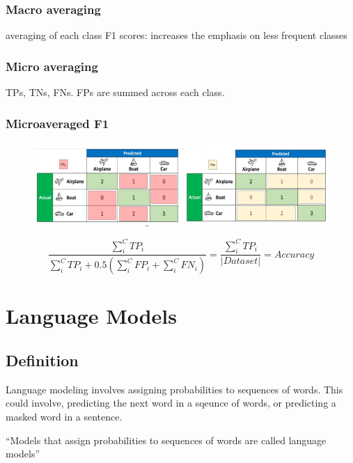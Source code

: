 \documentclass[11pt]{article}
\begin{document}
\subsubsection{Macro averaging}

averaging of each class F1 scores: increases the emphasis on less frequent classes

\subsubsection{Micro averaging}

TPs, TNs,  FNs. FPs are summed across each class.

\subsubsection{Microaveraged F1}

\begin{figure}[H]
    \centering
    \includegraphics[trim={0 .5cm 0 0}, clip, width=.9\linewidth]{figures/f1.png}    
\end{figure}

\begin{equation*}
    \frac{\sum^C_i TP_i}{\sum^C_i TP_i + 0.5 (\sum^C_i FP_i + \sum^C_i FN_i)} = \frac{\sum^C_i TP_i}{|Dataset|} = Accuracy
\end{equation*}

\section{Language Models}

\subsection{Definition}

\begin{definition}
    Language modeling involves assigning probabilities to sequences of words. This could involve, predicting the next word in a sqeunce of words, or predicting a masked word in a sentence.

    ``Models that assign probabilities to sequences of words are called language models''\cite{book-speech-and-language-processing}
\end{definition}
\end{document}
